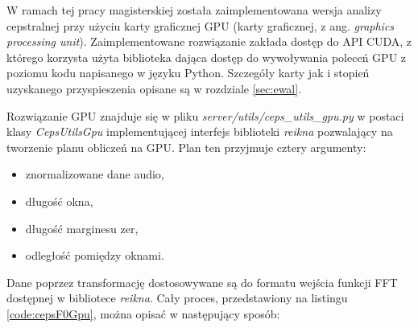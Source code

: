 \documentclass[12pt,a4paper,twoside]{mwart}
\begin{document}
W ramach tej pracy magisterskiej została zaimplementowana wersja analizy cepstralnej przy użyciu karty graficznej GPU (karty graficznej, z ang. \textit{graphics processing unit}). Zaimplementowane rozwiązanie zakłada dostęp do API CUDA, z którego korzysta użyta biblioteka dająca dostęp do wywoływania poleceń GPU z poziomu kodu napisanego w języku Python. Szczegóły karty jak i stopień uzyskanego przyspieszenia opisane są w rozdziale \ref{sec:ewal}.

Rozwiązanie GPU znajduje się w pliku \textit{server/utils/ceps\_utils\_gpu.py} w postaci klasy \textit{CepsUtilsGpu} implementującej interfejs biblioteki \textit{reikna} pozwalający na tworzenie planu obliczeń na GPU. Plan ten przyjmuje cztery argumenty:
\begin{itemize}
  \item znormalizowane dane audio,
  \item długość okna,
  \item długość marginesu zer,
  \item odległość pomiędzy oknami.
\end{itemize}
Dane poprzez transformację dostosowywane są do formatu wejścia funkcji FFT dostępnej w bibliotece \textit{reikna}. Cały proces, przedstawiony na listingu \ref{code:cepsF0Gpu}, można opisać w następujący sposób:
\end{document}
